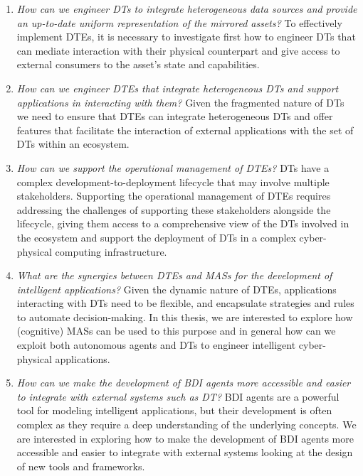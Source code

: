 \begin{enumerate}[label=\textbf{RQ\arabic*}]

  \item\label{rq:1}
  \emph{How can we engineer \acp{DT} to integrate heterogeneous data sources and provide an up-to-date uniform representation of the mirrored assets?}
  \newline
  To effectively implement \acp{DTE}, it is necessary to investigate first how to engineer \acp{DT} that can mediate interaction with their physical counterpart and give access to external consumers to the asset's state and capabilities.

  \item\label{rq:2}
  \emph{How can we engineer \acp{DTE} that integrate heterogeneous \acp{DT} and support applications in interacting with them?}
  \newline
  Given the fragmented nature of \acp{DT} we need to ensure that \acp{DTE} can integrate heterogeneous \acp{DT} and offer features that facilitate the interaction of external applications with the set of \acp{DT} within an ecosystem.

  \item\label{rq:3}
  \emph{How can we support the operational management of \acp{DTE}?}
  \newline
  \acp{DT} have a complex development-to-deployment lifecycle that may involve multiple stakeholders. Supporting the operational management of \acp{DTE} requires addressing the challenges of supporting these stakeholders alongside the lifecycle, giving them access to a comprehensive view of the \acp{DT} involved in the ecosystem and support the deployment of \acp{DT} in a complex cyber-physical computing infrastructure.
  
  \item\label{rq:4}
  \emph{What are the synergies between \acp{DTE} and \acp{MAS} for the development of intelligent applications?}
  \newline
  Given the dynamic nature of \acp{DTE}, applications interacting with \acp{DT} need to be flexible, and encapsulate strategies and rules to automate decision-making. In this thesis, we are interested to explore how (cognitive) \acp{MAS} can be used to this purpose and in general how can we exploit both autonomous agents and \acp{DT} to engineer intelligent cyber-physical applications.  


  \item\label{rq:5}
  \emph{How can we make the development of \ac{BDI} agents more accessible and easier to integrate with external systems such as \ac{DT}?}
  \newline
  \ac{BDI} agents are a powerful tool for modeling intelligent applications, but their development is often complex as they require a deep understanding of the underlying concepts. We are interested in exploring how to make the development of \ac{BDI} agents more accessible and easier to integrate with external systems looking at the design of new tools and frameworks.
\end{enumerate}



